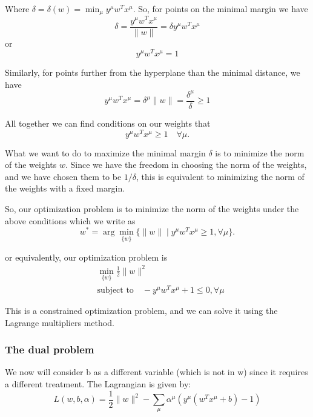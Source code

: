 \documentclass[11pt]{book} %
\begin{document}
Where \( \delta = \delta(w) = \min_{\mu} y^{\mu}w^T x^{\mu} \). So, for points on the minimal margin we have
\begin{equation}
    \delta = \frac{y^{\mu}w^T x^{\mu}}{\lVert w \rVert} = \delta y^{\mu}w^T x^{\mu}  
\end{equation}
or
\begin{equation}
    y^{\mu}w^T x^{\mu} = 1 
\end{equation}

Similarly, for points further from the hyperplane than the minimal distance, we have
\begin{equation}
    y^{\mu}w^T x^{\mu} =  \delta ^{\mu}  \lVert w \rVert = \frac{\delta^{\mu}}{\delta} \geq 1
\end{equation}

All together we can find conditions on our weights that
\begin{equation}
    y^{\mu}w^T x^{\mu} \geq 1 \quad \forall \mu.  
\end{equation}

What we want to do to maximize the minimal margin \( \delta \) is to minimize the norm of the weights \( w \). 
Since we have the freedom in choosing the norm of the weights, and we have chosen them to be \( 1/\delta \), this is equivalent to minimizing the norm of the weights with a fixed margin.

So, our optimization problem is to minimize the norm of the weights under the above conditions which we write as
\begin{equation}
    w^* = \arg \min_{\{w\}} \{ \lVert w \rVert \mid y^{\mu}w^T x^{\mu} \geq 1, \forall \mu \}. 
\end{equation}

or equivalently, our optimization problem is 
\begin{align*}
    &\min_{\{w\}} \frac{1}{2} \lVert w \rVert^2 \\
    &\text{subject to} \quad  -y^{\mu}w^T x^{\mu} + 1 \leq 0, \forall \mu
\end{align*}

This is a constrained optimization problem, and we can solve it using the Lagrange multipliers method.

%
%

\subsubsection{The dual problem}
We now will consider b as a different variable (which is not in w) since it requires a different treatment.
The Lagrangian is given by:
\begin{equation}
    L(w, b, \alpha) = \frac{1}{2} \lVert w \rVert^2 - \sum_{\mu} \alpha^{\mu} (y^{\mu}(w^T x^{\mu} + b) - 1)
\end{equation}
\end{document}
